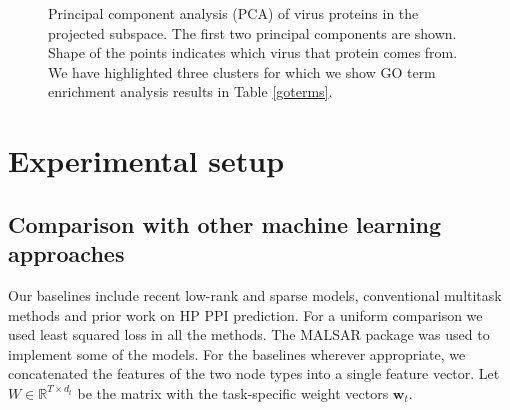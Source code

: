 \documentclass{bioinfo}
\begin{document}
\begin{figure}
\begin{floatrow}
{
\caption{Principal component analysis (PCA) of virus proteins in the projected subspace. The first two principal components are shown. Shape of the points indicates which virus that protein comes from. We have highlighted three clusters for which we show GO term enrichment analysis results in Table \ref{goterms}.}%
\label{fig:pca2}
}
\end{floatrow}
\end{figure}





\section{Experimental setup}

\subsection{Comparison with other machine learning approaches}
\label{mlmethods}
Our baselines include recent low-rank and sparse models, conventional multitask methods and prior work on HP PPI prediction. For a uniform comparison we used least squared loss in all the methods. The MALSAR \citep{malsar} package was used to implement some of the models. For the baselines wherever appropriate, we concatenated the features of the two node types into a single feature vector. Let $W \in \mathbb{R}^{T \times d_t}$ be the matrix with the task-specific weight vectors $\mathbf{w}_t$.
 
\end{document}
